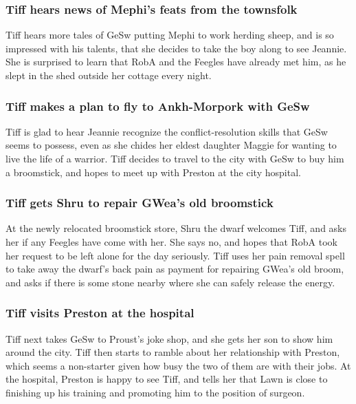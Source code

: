 \subsubsection{\Gls{Tiff} hears news of \Gls{Mephi}'s feats from the townsfolk}
\Gls{Tiff} hears more tales of \Gls{GeSw} putting \Gls{Mephi} to work herding sheep, and is so
impressed with his talents, that she decides to take the boy along to see \Gls{Jeannie}. She is
surprised to learn that \Gls{RobA} and the Feegles have already met him, as he slept in the shed
outside her cottage every night.

\subsubsection{\Gls{Tiff} makes a plan to fly to Ankh-Morpork with \Gls{GeSw}}
\Gls{Tiff} is glad to hear \Gls{Jeannie} recognize the conflict-resolution skills that \Gls{GeSw}
seems to possess, even as she chides her eldest daughter \Gls{Maggie} for wanting to live the life
of a warrior. \Gls{Tiff} decides to travel to the city with \Gls{GeSw} to buy him a broomstick, and
hopes to meet up with \Gls{Preston} at the city hospital.

\subsubsection{\Gls{Tiff} gets \Gls{Shru} to repair \Gls{GWea}'s old broomstick}
At the newly relocated broomstick store, \Gls{Shru} the dwarf welcomes \Gls{Tiff}, and asks her if
any Feegles have come with her. She says no, and hopes that \Gls{RobA} took her request to be left
alone for the day seriously. \Gls{Tiff} uses her pain removal spell to take away the dwarf's back
pain as payment for repairing \Gls{GWea}'s old broom, and asks if there is some stone nearby where
she can safely release the energy.

\subsubsection{\Gls{Tiff} visits \Gls{Preston} at the hospital}
\Gls{Tiff} next takes \Gls{GeSw} to \Gls{Proust}'s joke shop, and she gets her son to show him
around the city. \Gls{Tiff} then starts to ramble about her relationship with \Gls{Preston}, which
seems a non-starter given how busy the two of them are with their jobs. At the hospital,
\Gls{Preston} is happy to see \Gls{Tiff}, and tells her that \Gls{Lawn} is close to finishing up
his training and promoting him to the position of surgeon.


